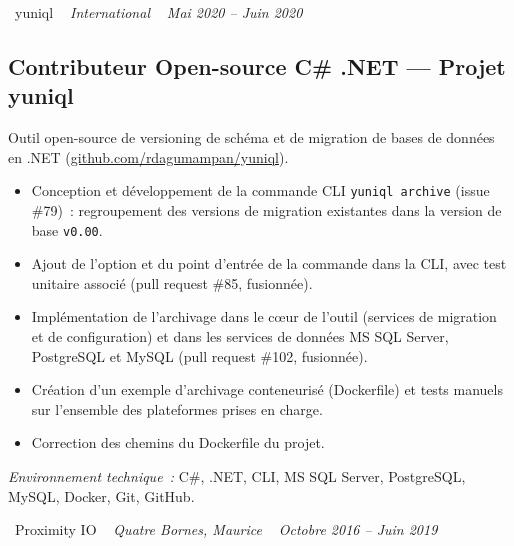 \documentclass[10pt,a4paper]{article}
\begin{document}
\vspace{10pt}

\noindent\textcolor{primary}{ \faBuilding\ yuniql} \quad
\textit{ \small \textcolor{darkgray}{ \faMapMarker\ } International } \hfill
\textit{ \small \textcolor{darkgray}{ \faCalendar\ } Mai 2020 -- Juin 2020 }

\vspace{4pt}

\subsection*{Contributeur Open-source C\# .NET --- Projet yuniql}
\color{darkgray}
Outil open-source de versioning de schéma et de migration de bases de données en .NET (\href{https://github.com/rdagumampan/yuniql}{github.com/rdagumampan/yuniql}).
\begin{itemize}
  \item Conception et développement de la commande CLI \texttt{yuniql archive} (issue \#79)~: regroupement des versions de migration existantes dans la version de base \texttt{v0.00}.
  \item Ajout de l'option et du point d'entrée de la commande dans la CLI, avec test unitaire associé (pull request \#85, fusionnée).
  \item Implémentation de l'archivage dans le cœur de l'outil (services de migration et de configuration) et dans les services de données MS SQL Server, PostgreSQL et MySQL (pull request \#102, fusionnée).
  \item Création d'un exemple d'archivage conteneurisé (Dockerfile) et tests manuels sur l'ensemble des plateformes prises en charge.
  \item Correction des chemins du Dockerfile du projet.
\end{itemize}
\textit{Environnement technique~:} C\#, .NET, CLI, MS SQL Server, PostgreSQL, MySQL, Docker, Git, GitHub.

\vspace{10pt}

\noindent\textcolor{primary}{ \faBuilding\ Proximity IO} \quad
\textit{ \small \textcolor{darkgray}{ \faMapMarker\ } Quatre Bornes, Maurice } \hfill
\textit{ \small \textcolor{darkgray}{ \faCalendar\ } Octobre 2016 -- Juin 2019 }

\vspace{4pt}
\end{document}
